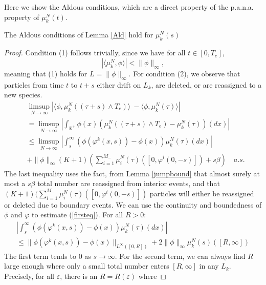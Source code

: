 Here we show the Aldous conditions, which are a direct property of the p.a.n.a. property of $\mu^N_k(t)$.

\begin {lem}
The Aldous conditions of Lemma \ref{Ald} hold for $\mu^N_k(s)$
\end {lem}

\begin{proof} Condition (1) follows trivially, since we have for all $t \in [0, T_e]$,  
\begin{equation}
|\langle \mu_k^N,\phi \rangle|<\|\phi \|_\infty,
\end{equation}
meaning that (1) holds for $ L = \|\phi\|_\infty$.  For condition (2), we observe that particles from time $t$ to $t+s$ either drift on $L_k$, are deleted, or are reassigned to a new species. 
\begin{align}
&\limsup_{N\rightarrow \infty} |\langle\phi,\mu_k^N((\tau+s )\wedge T_{e})\rangle \  - \langle\phi,\mu_k^N(\tau)\rangle|  \\&= \limsup_{N\rightarrow \infty}\left| \int_{\mathbb{R}^+}\phi(x) (\mu_k^N((\tau+s) \wedge T_{e})- \mu_k^N(\tau))(dx)\right | \nonumber \\\label{firsteq}
&\le \limsup_{N\rightarrow \infty} \left | \int_s^\infty (\phi(\varphi^k (x,s))-\phi(x))\mu_k^N(\tau)(dx) \right | \nonumber \\
&+\|\phi\|_\infty (K+1)\left(\sum_{i = 1}^{M_-}\mu_{i}^N(\tau)([0,\varphi^i (0,-s)])+s\beta\right) \quad a.s. \nonumber 
\end{align}
The last inequality uses the fact, from  Lemma \ref{jumpbound} that almost surely at most a $s\beta$ total number are reassigned from interior events,   and that $(K+1)(\sum_{i = 1}^{M_-}\mu_{i}^N(\tau)([0,\varphi^i (0,-s)])$ particles will either be reassigned or deleted due to boundary events. 
We can use the continuity and boundedness of $\phi$ and $\varphi$ to estimate  (\ref{firsteq}).  For all $R>0$:
\begin{eqnarray}\label{infbound}
\left| \int_s^\infty (\phi(\varphi^k(x,s))-\phi(x))\mu_k^N(\tau)(dx) \right |\\
\le \|\phi(\varphi^k(x,s))-\phi(x)\|_{L^\infty([0,R])}+2\|\phi\|_\infty \mu_k^N(s)([R,\infty])\nonumber 
\end{eqnarray}
The first term tends to 0 as $s\rightarrow \infty$.  For the second term, we can always find $R$ large enough where only a small total number enters $[R, \infty]$ in any $L_k$.  Precisely, for all $\varepsilon$, there is an $R = R(\varepsilon)$ where 

\end{proof}
